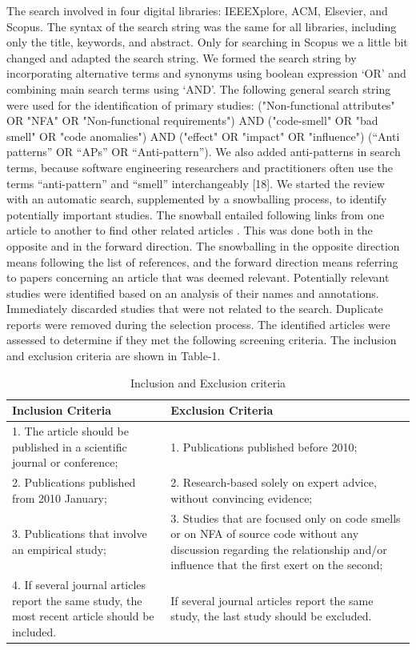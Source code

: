 \documentclass{sigchi}
\begin{document}
The search involved in four digital libraries: IEEEXplore, ACM, Elsevier, and Scopus. The syntax of the search string was the same for all libraries, including only the title, keywords, and abstract. Only for searching in Scopus we a little bit changed and adapted the search string. We formed the search string by incorporating alternative terms and synonyms using boolean expression ‘OR’ and combining main search terms using ‘AND’. The following general search string were used for the identification of primary studies: ("Non-functional attributes" OR "NFA" OR "Non-functional requirements") AND ("code-smell" OR "bad smell" OR "code anomalies") AND ("effect" OR "impact" OR "influence") (“Anti patterns” OR “APs” OR “Anti-pattern”). We also added anti-patterns in search terms, because software engineering researchers and practitioners often use the terms “anti-pattern” and “smell” interchangeably [18]. 
We started the review with an automatic search, supplemented by a snowballing process, to identify potentially important studies. The snowball entailed following links from one article to another to find other related articles \cite{Skoglund}. This was done both in the opposite and in the forward direction. The snowballing in the opposite direction means following the list of references, and the forward direction means referring to papers concerning an article that was deemed relevant. Potentially relevant studies were identified based on an analysis of their names and annotations. Immediately discarded studies that were not related to the search. Duplicate reports were removed during the selection process.
The identified articles were assessed to determine if they met the following screening criteria. The inclusion and exclusion criteria are shown in Table-1. \\

\begin{table}[h]
	\small
	\begin{tabular}{ p{35mm} |  p{35mm}}
		\toprule
		\textbf{Inclusion Criteria} & \textbf{Exclusion Criteria}\\
		\midrule
		1. The article should be published in a scientific journal or conference; & 1. Publications published before 2010;\\
		2. Publications published from 2010 January; & 2.	Research-based solely on expert advice, without convincing evidence;\\
		3. Publications that involve an empirical study; & 3. Studies that are focused only on code smells or on NFA of source code without any discussion regarding the relationship and/or influence that the first exert on the second;\\
		4. If several journal articles report the same study, the most recent article should be included. & If several journal articles report the same study, the last study should be excluded. \\
		\bottomrule
	\end{tabular}
	\caption{Inclusion and Exclusion criteria}~\label{tab:in_ex_criteria}
\end{table}
\end{document}
